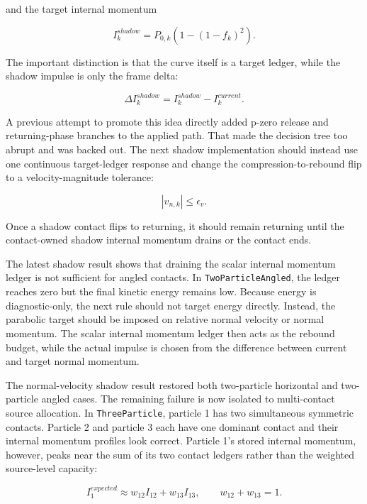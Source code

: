 and the target internal momentum

\begin{equation}
I^{shadow}_{k}
=
P_{0,k}\left(1-\left(1-f_k\right)^2\right).
\end{equation}

The important distinction is that the curve itself is a target ledger, while
the shadow impulse is only the frame delta:

\begin{equation}
\Delta I^{shadow}_{k}=I^{shadow}_{k}-I^{current}_{k}.
\end{equation}

A previous attempt to promote this idea directly added p-zero release and
returning-phase branches to the applied path.  That made the decision tree too
abrupt and was backed out.  The next shadow implementation should instead use
one continuous target-ledger response and change the compression-to-rebound
flip to a velocity-magnitude tolerance:

\begin{equation}
|v_{n,k}| \leq \epsilon_v .
\end{equation}

Once a shadow contact flips to returning, it should remain returning until the
contact-owned shadow internal momentum drains or the contact ends.

The latest shadow result shows that draining the scalar internal momentum
ledger is not sufficient for angled contacts.  In \texttt{TwoParticleAngled},
the ledger reaches zero but the final kinetic energy remains low.  Because
energy is diagnostic-only, the next rule should not target energy directly.
Instead, the parabolic target should be imposed on relative normal velocity or
normal momentum.  The scalar internal momentum ledger then acts as the rebound
budget, while the actual impulse is chosen from the difference between current
and target normal momentum.

The normal-velocity shadow result restored both two-particle horizontal and
two-particle angled cases.  The remaining failure is now isolated to
multi-contact source allocation.  In \texttt{ThreeParticle}, particle 1 has two
simultaneous symmetric contacts.  Particle 2 and particle 3 each have one
dominant contact and their internal momentum profiles look correct.  Particle
1's stored internal momentum, however, peaks near the sum of its two contact
ledgers rather than the weighted source-level capacity:

\begin{equation}
I_{1}^{expected}
\approx
w_{12} I_{12} + w_{13} I_{13},
\qquad
w_{12}+w_{13}=1.
\end{equation}

